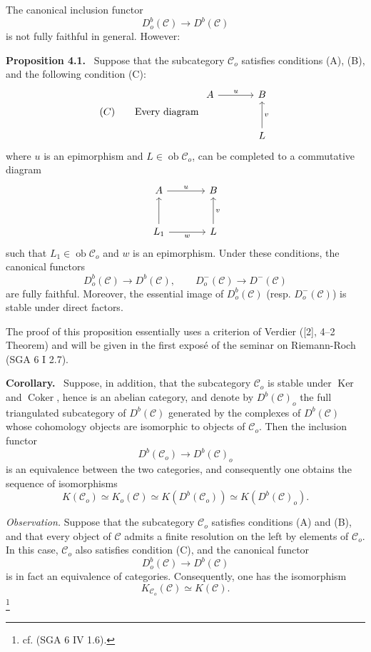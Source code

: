 \documentclass[11pt]{article}
\newenvironment{statement}[1]{\par\medskip\noindent\textbf{#1.}\ }{\par\medskip}
\providecommand{\Ker}{\operatorname{Ker}}
\providecommand{\Coker}{\operatorname{Coker}}
\providecommand{\Ob}{\operatorname{ob}}
\providecommand{\cC}{\mathcal C}
\providecommand{\Ker}{\operatorname{Ker}}
\providecommand{\Coker}{\operatorname{Coker}}
\providecommand{\Ker}{\operatorname{Ker}}
\providecommand{\Coker}{\operatorname{Coker}}
\providecommand{\Ob}{\operatorname{ob}}
\providecommand{\cC}{\mathcal C}
\providecommand{\Ob}{\operatorname{Ob}}
\providecommand{\Ob}{\operatorname{ob}}
\providecommand{\Ob}{\operatorname{Ob}}
\begin{document}
The canonical inclusion functor
\[
D_o^b(\cC)\longrightarrow D^b(\cC)
\]
is not fully faithful in general. However:

\label{sga5:VIII:proposition:4.1}\begin{statement}{Proposition 4.1}
Suppose that the subcategory $\cC_o$ satisfies conditions (A), (B), and the following condition (C):
\[
(C)\qquad
\text{Every diagram }
\begin{tikzcd}[column sep=large,row sep=large]
A \arrow[r,"u"]&B\\
&L \arrow[u,"v"']
\end{tikzcd}
\]
where $u$ is an epimorphism and $L\in\Ob\cC_o$, can be completed to a commutative diagram
\[
\begin{tikzcd}[column sep=large,row sep=large]
A \arrow[r,"u"]&B\\
L_1 \arrow[u] \arrow[r,"w"']&L \arrow[u,"v"']
\end{tikzcd}
\]
such that $L_1\in\Ob\cC_o$ and $w$ is an epimorphism. Under these conditions, the canonical functors
\[
D_o^b(\cC)\longrightarrow D^b(\cC),\qquad
D_o^-(\cC)\longrightarrow D^-(\cC)
\]
are fully faithful. Moreover, the essential image of $D_o^b(\cC)$ (resp. $D_o^-(\cC)$) is stable under direct factors.
\end{statement}

The proof of this proposition essentially uses a criterion of Verdier ([2], 4--2 Theorem) and will be given in the first exposé of the seminar on Riemann-Roch (SGA 6 I 2.7).

\begin{statement}{Corollary}
Suppose, in addition, that the subcategory $\cC_o$ is stable under $\Ker$ and $\Coker$, hence is an abelian category, and denote by $D^b(\cC)_o$ the full triangulated subcategory of $D^b(\cC)$ generated by the complexes of $D^b(\cC)$ whose cohomology objects are isomorphic to objects of $\cC_o$. Then the inclusion functor
\[
D^b(\cC_o)\longrightarrow D^b(\cC)_o
\]
is an equivalence between the two categories, and consequently one obtains the sequence of isomorphisms
\[
K(\cC_o)\simeq K_o(\cC)\simeq K(D^b(\cC_o))\simeq K(D^b(\cC)_o).
\tag{*}\label{sga5:VIII:equation:unnumbered}
\]
\end{statement}

\emph{Observation.} Suppose that the subcategory $\cC_o$ satisfies conditions (A) and (B), and that every object of $\cC$ admits a finite resolution on the left by elements of $\cC_o$. In this case, $\cC_o$ also satisfies condition (C), and the canonical functor
\[
D_o^b(\cC)\longrightarrow D^b(\cC)
\]
is in fact an equivalence of categories. Consequently, one has the isomorphism
\[
K_{\cC_o}(\cC)\simeq K(\cC).
\]
\footnote{cf. (SGA 6 IV 1.6).}
\end{document}
